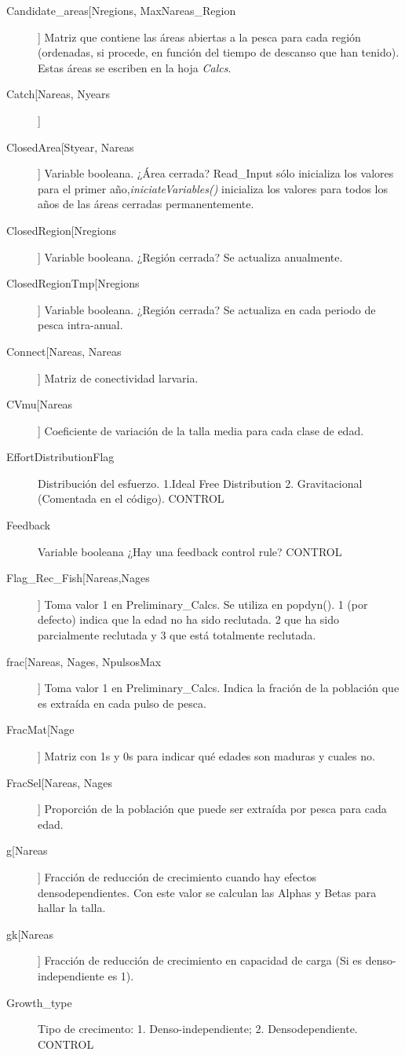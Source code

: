 \documentclass[12pt, oneside, a4paper]{article}
\begin{document}
\begin{description}
		
		\item[Candidate\_areas[Nregions, MaxNareas\_Region]] Matriz que contiene las áreas abiertas a la pesca para cada región (ordenadas, si procede, en función del tiempo de descanso que han tenido). Estas áreas se escriben en la hoja \emph{Calcs}.
		\item[Catch[Nareas, Nyears]]
		\item[ClosedArea[Styear, Nareas]] Variable booleana. ¿Área cerrada? Read\_Input sólo inicializa los valores para el primer año,\emph{iniciateVariables()} inicializa los valores para todos los años de las áreas cerradas permanentemente.
		\item[ClosedRegion[Nregions]] Variable booleana. ¿Región cerrada? Se actualiza anualmente.
		\item[ClosedRegionTmp[Nregions]] Variable booleana. ¿Región cerrada? Se actualiza en cada periodo de pesca intra-anual.		
		\item[Connect[Nareas, Nareas]] Matriz de conectividad larvaria.
		\item[CVmu[Nareas]] Coeficiente de variación de la talla media para cada clase de edad.
		
		\item[EffortDistributionFlag] Distribución del esfuerzo. 1.Ideal Free Distribution 2. Gravitacional (Comentada en el código). CONTROL
		
		\item[Feedback] Variable booleana ¿Hay una feedback control rule? CONTROL
		\item[Flag\_Rec\_Fish[Nareas,Nages]] Toma valor 1 en Preliminary\_Calcs. Se utiliza en popdyn(). 1 (por defecto) indica que la edad no ha sido reclutada. 2 que ha sido parcialmente reclutada y 3 que está totalmente reclutada.
		\item[frac[Nareas, Nages, NpulsosMax]] Toma valor 1 en Preliminary\_Calcs. Indica la fración de la población que es extraída en cada pulso de pesca.
		\item[FracMat[Nage]] Matriz con 1s y 0s para indicar qué edades son maduras y cuales no. 
		\item[FracSel[Nareas, Nages]] Proporción de la población que puede ser extraída por pesca para cada edad. 
		   
		\item[g[Nareas]] Fracción de reducción de crecimiento cuando hay efectos densodependientes. Con este valor se calculan las Alphas y Betas para hallar la talla.
		\item[gk[Nareas]] Fracción de reducción de crecimiento en capacidad de carga (Si es denso-independiente es 1).
		\item[Growth\_type] Tipo de crecimento: 1. Denso-independiente; 2. Densodependiente. CONTROL
		

\end{description}
\end{document}

